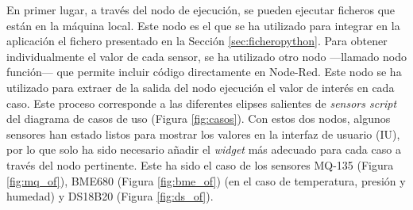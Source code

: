 En primer lugar, a través del nodo de ejecución, se pueden ejecutar ficheros que están en la máquina local. Este nodo es el que se ha utilizado para integrar en la aplicación el fichero presentado en la Sección \ref{sec:ficheropython}. Para obtener individualmente el valor de cada sensor, se ha utilizado otro nodo ---llamado nodo función--- que permite incluir código directamente en Node-Red. Este nodo se ha utilizado para extraer de la salida del nodo ejecución el valor de interés en cada caso. Este proceso corresponde a las diferentes elipses salientes de \textit{sensors script} del diagrama de casos de uso (Figura \ref{fig:casos}). Con estos dos nodos, algunos sensores han estado listos para mostrar los valores en la interfaz de usuario (IU), por lo que solo ha sido necesario añadir el \textit{widget} más adecuado para cada caso a través del nodo pertinente. Este ha sido el caso de los sensores MQ-135 (Figura \ref{fig:mq_of}), BME680 (Figura \ref{fig:bme_of}) (en el caso de temperatura, presión y humedad) y DS18B20 (Figura \ref{fig:ds_of}).\\

